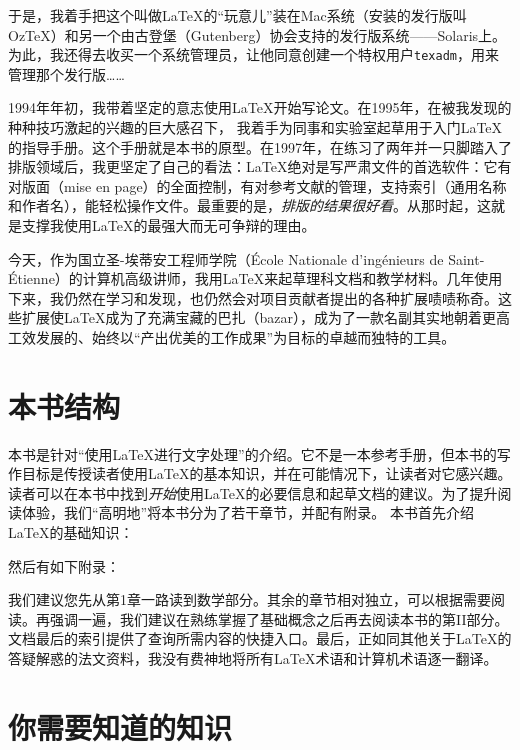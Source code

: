 于是，我着手把这个叫做\LaTeX 的“玩意儿”装在Mac系统（安装的发行版叫Oz\TeX ）和另一个由古登堡（Gutenberg）协会支持的发行版系统——Solaris上。为此，我还得去收买一个系统管理员，让他同意创建一个特权用户\texttt{texadm}，用来管理那个发行版……

1994年年初，我带着坚定的意志使用\LaTeX 开始写论文。在1995年，在被我发现的种种技巧激起的兴趣的巨大感召下，%
我着手为同事和实验室起草用于入门\LaTeX 的指导手册。这个手册就是本书的原型。在1997年，在练习了两年并一只脚踏入了排版领域后，我更坚定了自己的看法：\LaTeX 绝对是写严肃文件的首选软件：它有对版面（mise en page）的全面控制，有对参考文献的管理，支持索引（通用名称和作者名），能轻松操作文件。最重要的是，\textit{排版的结果很好看}。从那时起，这就是支撑我使用\LaTeX 的最强大而无可争辩的理由。

今天，作为国立圣-埃蒂安工程师学院（École Nationale d’ingénieurs de Saint-Étienne）的计算机高级讲师，我用\LaTeX 来起草理科文档和教学材料。几年使用下来，我仍然在学习和发现，也仍然会对项目贡献者提出的各种扩展啧啧称奇。这些扩展使\LaTeX 成为了充满宝藏的巴扎（bazar），成为了一款名副其实地朝着更高工效发展的、始终以“产出优美的工作成果”为目标的卓越而独特的工具。

\section*{本书结构}

本书是针对“使用\LaTeX 进行文字处理”的介绍。它不是一本参考手册，但本书的写作目标是传授读者使用\LaTeX 的基本知识，并在可能情况下，让读者对它感兴趣。读者可以在本书中找到\textit{开始}使用\LaTeX 的必要信息和起草文档的建议。为了提升阅读体验，我们“高明地”将本书分为了若干章节，并配有附录。
本书首先介绍\LaTeX 的基础知识：


然后有如下附录：


我们建议您先从第1章一路读到数学部分。其余的章节相对独立，可以根据需要阅读。再强调一遍，我们建议在熟练掌握了基础概念之后再去阅读本书的第II部分。文档最后的索引提供了查询所需内容的快捷入口。最后，正如同其他关于\LaTeX 的答疑解惑的法文资料，我没有费神地将所有\LaTeX 术语和计算机术语逐一翻译。

\section*{你需要知道的知识}

